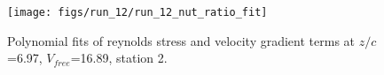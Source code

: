 \begin{figure}[H]
\centering
\texttt{[image: figs/run\_12/run\_12\_nut\_ratio\_fit]}
\caption{Polynomial fits of reynolds stress and velocity gradient terms at $z/c$=6.97, $V_{free}$=16.89, station 2.}
\label{fig:run_12_nut_ratio_fit}
\end{figure}


